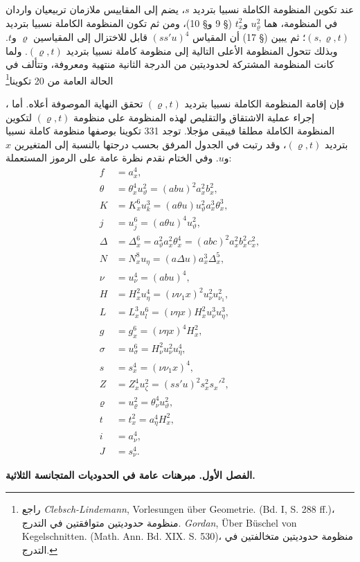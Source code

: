 \documentclass[11pt]{article}
\newcommand{\srcLTR}[1]{\relax\ifmmode\text{\mbox{\babelsublr{\foreignlanguage{english}{#1}}}}\else\babelsublr{\foreignlanguage{english}{#1}}\fi}
\newcommand{\srcfn}[2]{\begingroup\renewcommand{\thefootnote}{\srcLTR{#1}}\footnote{#2}\addtocounter{footnote}{-1}\endgroup}
\begin{document}
عند تكوين المنظومة الكاملة نسبيا بترديد $s$، يضم إلى المقاييس ملازمان تربيعيان واردان في المنظومة، هما $u_\varrho^2$ و$t_x^2$ (§ 9 و§ 10)، ومن ثم تكون المنظومة الكاملة نسبيا بترديد $(s,\varrho,t)$؛ ثم يبين (§ 17) أن المقياس $(ss'u)^4$ قابل للاختزال إلى المقياسين $\varrho$ و$t$. وبذلك تتحول المنظومة الأعلى التالية إلى منظومة كاملة نسبيا بترديد $(\varrho,t)$. ولما كانت المنظومة المشتركة لحدوديتين من الدرجة الثانية منتهية ومعروفة، وتتألف في الحالة العامة من 20 تكوينا\srcfn{*)}{راجع \emph{Clebsch-Lindemann}, Vorlesungen über Geometrie. (Bd. I, S. 288 ff.)، منظومة حدوديتين متوافقتين في التدرج. \emph{Gordan}, Über Büschel von Kegelschnitten. (Math. Ann. Bd. XIX. S. 530)، منظومة حدوديتين متخالفتين في التدرج.}، فإن إقامة المنظومة الكاملة نسبيا بترديد $(\varrho,t)$ تحقق النهاية الموصوفة أعلاه. أما إجراء عملية الاشتقاق والتقليص لهذه المنظومة على منظومة $(\varrho,t)$ لتكوين المنظومة الكاملة مطلقا فيبقى مؤجلا.
توجد 331 تكوينا بوصفها منظومة كاملة نسبيا بترديد $(\varrho,t)$، وقد رتبت في الجدول المرفق بحسب درجتها بالنسبة إلى المتغيرين $x$ و$u$.
وفي الختام نقدم نظرة عامة على الرموز المستعملة:
\begin{align*}
f&=a_x^4,\\
\theta&=\theta_x^4u_\vartheta^2=(abu)^2a_x^2b_x^2,\\
K&=K_x^6u_k^3=(a\theta u)u_\vartheta^2a_x^3\theta_x^3,\\
j&=u_j^6=(a\theta u)^4u_\vartheta^2,\\
\Delta&=\Delta_x^6=a_\vartheta^2a_x^2\theta_x^4=(abc)^2a_x^2b_x^2c_x^2,\\
N&=N_x^8u_\eta=(a\Delta u)a_x^3\Delta_x^5,\\
\nu&=u_\nu^4=(abu)^4,\\
H&=H_x^2u_\eta^4=(\nu\nu_1x)^2u_\nu^2u_{\nu_1}^2,\\
L&=L_x^3u_l^6=(\nu\eta x)H_x^2u_\nu^3u_\eta^3,\\
g&=g_x^6=(\nu\eta x)^4H_x^2,\\
\sigma&=u_\sigma^6=H_\nu^2u_\nu^2u_\eta^4,\\
s&=s_x^4=(\nu\nu_1x)^4,\\
Z&=Z_x^4u_\zeta^2=(ss'u)^2s_x^2s_x'^2,\\
\varrho&=u_\varrho^2=\theta_\nu^4u_\vartheta^2,\\
t&=t_x^2=a_\eta^4H_x^2,\\
i&=a_\nu^4,\\
J&=s_\nu^4.
\end{align*}
\begin{center}
{\Large\bfseries الفصل الأول. \quad مبرهنات عامة في الحدوديات المتجانسة الثلاثية.}
\end{center}
\end{document}
